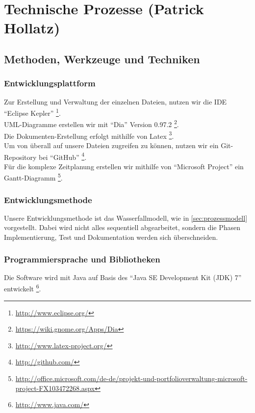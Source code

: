 \documentclass[fontsize=12pt,paper=a4,twoside]{scrartcl}
\begin{document}
\newpage
\section{Technische Prozesse (Patrick Hollatz)}
\subsection{Methoden, Werkzeuge und Techniken}
\subsubsection{Entwicklungsplattform}
Zur Erstellung und Verwaltung der einzelnen Dateien, nutzen wir die IDE "`Eclipse Kepler"' \footnote{\url{http://www.eclipse.org/}}.\\
UML-Diagramme erstellen wir mit "`Dia"' Version 0.97.2 \footnote{\url{https://wiki.gnome.org/Apps/Dia}}.\\
Die Dokumenten-Erstellung erfolgt mithilfe von Latex \footnote{\url{http://www.latex-project.org/}}.\\
Um von überall auf unsere Dateien zugreifen zu können, nutzen wir ein Git-Repository bei "`GitHub"' \footnote{\url{http://github.com/}}.\\
Für die komplexe Zeitplanung erstellen wir mithilfe von "`Microsoft Project"' ein Gantt-Diagramm \footnote{\url{http://office.microsoft.com/de-de/projekt-und-portfolioverwaltung-microsoft-project-FX103472268.aspx}}.

\subsubsection{Entwicklungsmethode}

Unsere Entwicklungsmethode ist das Wasserfallmodell, wie in \ref{sec:prozessmodell} vorgestellt. Dabei wird nicht alles sequentiell abgearbeitet, sondern die Phasen Implementierung, Test und Dokumentation werden sich überschneiden.

\subsubsection{Programmiersprache und Bibliotheken}

Die Software wird mit Java auf Basis des "`Java SE Development Kit (JDK) 7"' entwickelt \footnote{\url{http://www.java.com/}}.\\
\end{document}
